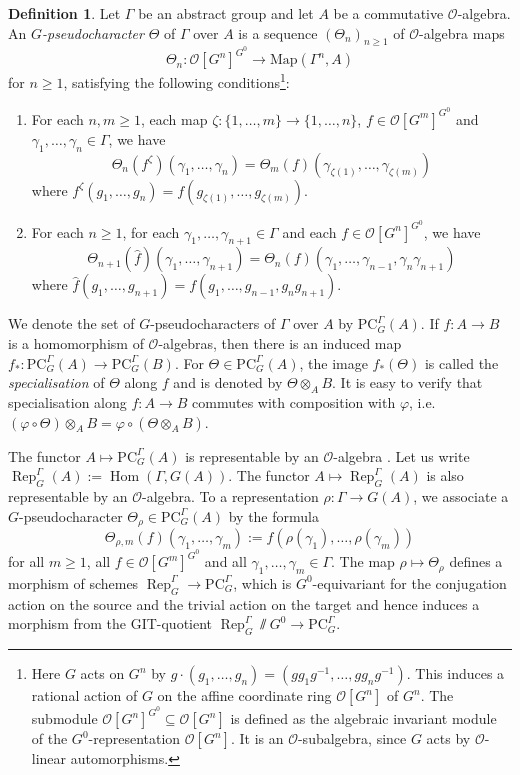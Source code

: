 \documentclass{amsart}
\theoremstyle{definition}
\newtheorem{defi}[prop]{Definition}
\theoremstyle{remark}
\DeclareMathOperator{\Hom}{Hom}
\DeclareMathOperator{\Rep}{Rep}
\newcommand{\OO}{\mathcal O}
\newcommand{\PC}{\mathrm{PC}}
\begin{document}
\begin{defi}\label{LafPC} Let $\Gamma$ be an abstract group and let $A$ be a commutative $\OO$-algebra. An \emph{$G$-pseudocharacter} $\Theta$ of $\Gamma$ over $A$ is a sequence $(\Theta_n)_{n \geq 1}$ of $\OO$-algebra maps
$$\Theta_n : \OO[G^n]^{G^0} \to \mathrm{Map}(\Gamma^n,A)$$ for $n \geq 1$, satisfying the following conditions\footnote{Here $G$ acts on $G^n$ by $g \cdot (g_1, \dots, g_n) = (gg_1g^{-1}, \dots, gg_ng^{-1})$. This induces a rational action of $G$ on the affine coordinate ring $\OO[G^n]$ of $G^n$. The submodule $\OO[G^n]^{G^0} \subseteq \OO[G^n]$ is defined as the algebraic invariant module of the $G^0$-representation $\OO[G^n]$. It is an $\OO$-subalgebra, since $G$ acts by $\OO$-linear automorphisms.}:
\begin{enumerate}
    \item For each $n,m \geq 1$, each map $\zeta : \{1, \dots, m\} \to \{1, \dots,n\}$, $f \in \OO[G^m]^{G^0}$ and $\gamma_1, \dots, \gamma_n \in \Gamma$, we have
    $$ \Theta_n(f^{\zeta})(\gamma_1, \dots, \gamma_n) = \Theta_m(f)(\gamma_{\zeta(1)}, \dots, \gamma_{\zeta(m)}) $$
    where $f^{\zeta}(g_1, \dots, g_n) = f(g_{\zeta(1)}, \dots, g_{\zeta(m)})$.
    \item For each $n \geq 1$, for each $\gamma_1, \dots, \gamma_{n+1} \in \Gamma$ and each $f \in \OO[G^n]^{G^0}$, we have
    $$ \Theta_{n+1}(\hat f)(\gamma_1, \dots, \gamma_{n+1}) = \Theta_n(f)(\gamma_1, \dots, \gamma_{n-1}, \gamma_n\gamma_{n+1}) $$
    where $\hat f(g_1, \dots, g_{n+1}) = f(g_1, \dots, g_{n-1}, g_ng_{n+1})$.
\end{enumerate}
\end{defi}
We denote the set of $G$-pseudocharacters of $\Gamma$ over $A$ by $\PC_G^{\Gamma}(A)$.
If $f : A \to B$ is a homomorphism of $\OO$-algebras, then there is an induced map $f_* : \mathrm{PC}_{G}^{\Gamma}(A) \to \mathrm{PC}_{G}^{\Gamma}(B)$.
For $\Theta \in \mathrm{PC}_{G}^{\Gamma}(A)$, the image $f_*(\Theta)$ is called the \emph{specialisation} of $\Theta$ along $f$ and is denoted by $\Theta \otimes_A B$.
It is easy to verify that specialisation along $f : A \to B$ commutes with composition with $\varphi$, i.e. $(\varphi \circ \Theta) \otimes_A B = \varphi \circ (\Theta \otimes_A B)$.

The functor $A \mapsto \PC^{\Gamma}_G(A)$ is representable by an $\OO$-algebra \cite[Theorem 3.19]{quast}.
Let us write $\Rep^{\Gamma}_G(A) := \Hom(\Gamma, G(A))$.
The functor $A \mapsto \Rep^{\Gamma}_G(A)$ is also representable by an $\OO$-algebra.
To a representation $\rho : \Gamma \to G(A)$,
we associate a $G$-pseudocharacter $\Theta_{\rho} \in \PC^{\Gamma}_G(A)$ by the formula
\begin{equation}\label{rep_to_pc}
\Theta_{\rho, m}(f)(\gamma_1, \dots, \gamma_m) := f(\rho(\gamma_1), \dots, \rho(\gamma_m))
\end{equation}
for all $m \geq 1$, all $f \in \OO[G^m]^{G^0}$ and all $\gamma_1, \dots, \gamma_m \in \Gamma$.
The map $\rho \mapsto \Theta_{\rho}$ defines a morphism of schemes $\Rep^{\Gamma}_G \to \PC^{\Gamma}_G$,
which is $G^0$-equivariant for the conjugation action on the source and the trivial action on the target and hence induces a morphism from the GIT-quotient
$\Rep^{\Gamma}_G\sslash G^0\rightarrow \PC^{\Gamma}_G$. 
\end{document}
